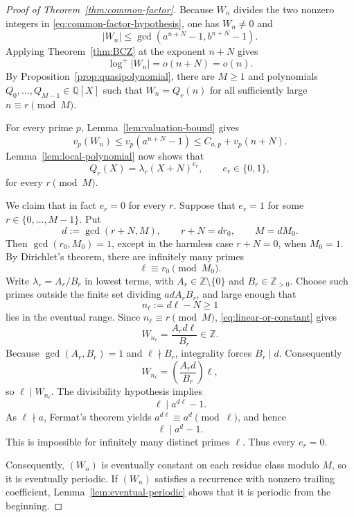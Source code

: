 \documentclass[11pt]{amsart}
\theoremstyle{remark}
\numberwithin{equation}{section}
\newcommand{\Z}{\mathbb Z}
\newcommand{\Q}{\mathbb Q}
\begin{document}
\begin{proof}[Proof of Theorem~\ref{thm:common-factor}]
Because $W_n$ divides the two nonzero integers in
\eqref{eq:common-factor-hypothesis}, one has $W_n\ne 0$ and
\[
  |W_n|\le \gcd(a^{n+N}-1,b^{n+N}-1).
\]
Applying Theorem~\ref{thm:BCZ} at the exponent $n+N$ gives
\[
  \log^+|W_n|=o(n+N)=o(n).
\]
By Proposition~\ref{prop:quasipolynomial}, there are $M\ge 1$ and polynomials
$Q_0,\dots,Q_{M-1}\in\Q[X]$ such that $W_n=Q_r(n)$ for all sufficiently large
$n\equiv r\pmod M$.

For every prime $p$, Lemma~\ref{lem:valuation-bound} gives
\[
  v_p(W_n)\le v_p(a^{n+N}-1)
  \le C_{a,p}+v_p(n+N).
\]
Lemma~\ref{lem:local-polynomial} now shows that
\begin{equation}\label{eq:linear-or-constant}
  Q_r(X)=\lambda_r(X+N)^{e_r},
  \qquad e_r\in\{0,1\},
\end{equation}
for every $r\pmod M$.

We claim that in fact $e_r=0$ for every $r$.  Suppose that $e_r=1$ for some
$r\in\{0,\dots,M-1\}$.  Put
\[
  d:=\gcd(r+N,M),\qquad r+N=d r_0,\qquad M=dM_0.
\]
Then $\gcd(r_0,M_0)=1$, except in the harmless case $r+N=0$, when $M_0=1$.
By Dirichlet's theorem, there are infinitely many primes
\[
  \ell\equiv r_0\pmod{M_0}.
\]
Write $\lambda_r=A_r/B_r$ in lowest terms, with
$A_r\in\Z\setminus\{0\}$ and $B_r\in\Z_{>0}$.  Choose such primes outside the
finite set dividing $a d A_rB_r$, and large enough that
\[
  n_\ell:=d\ell-N\ge 1
\]
lies in the eventual range.  Since $n_\ell\equiv r\pmod M$,
\eqref{eq:linear-or-constant} gives
\[
  W_{n_\ell}=\frac{A_r d\ell}{B_r}\in\Z.
\]
Because $\gcd(A_r,B_r)=1$ and $\ell\nmid B_r$, integrality forces
$B_r\mid d$.  Consequently
\[
  W_{n_\ell}=\left(\frac{A_r d}{B_r}\right)\ell,
\]
so $\ell\mid W_{n_\ell}$.  The divisibility hypothesis implies
\[
  \ell\mid a^{d\ell}-1.
\]
As $\ell\nmid a$, Fermat's theorem yields
$a^{d\ell}\equiv a^d\pmod\ell$, and hence
\[
  \ell\mid a^d-1.
\]
This is impossible for infinitely many distinct primes $\ell$.  Thus every
$e_r=0$.

Consequently, $(W_n)$ is eventually constant on each residue class modulo $M$,
so it is eventually periodic.  If $(W_n)$ satisfies a recurrence with nonzero
trailing coefficient, Lemma~\ref{lem:eventual-periodic} shows that it is periodic
from the beginning.
\end{proof}
\end{document}
